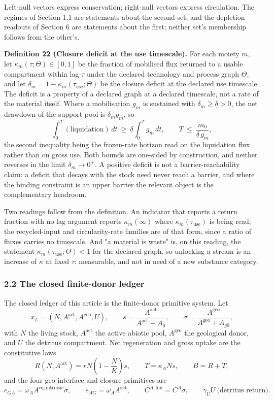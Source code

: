 \documentclass[11pt]{article}
\begin{document}
Left-null vectors express conservation; right-null vectors express circulation. The regimes of
Section 1.1 are statements about the second set, and the depletion readouts of Section 6 are
statements about the first; neither set's membership follows from the other's.

\textbf{Definition 22 (Closure deficit at the use timescale).} For each moiety \(m\), let
\(\kappa_m(\tau;\Theta)\in[0,1]\) be the fraction of mobilised flux returned to a usable compartment
within lag \(\tau\) under the declared technology and process graph \(\Theta\), and let
\(\delta_m=1-\kappa_m(\tau_{\mathrm{use}};\Theta)\) be the closure deficit at the declared use
timescale. The deficit is a property of a declared graph at a declared timescale, not a rate of the
material itself. Where a mobilisation \(g_m\) is sustained with \(\delta_m\ge\underline\delta>0\),
the net drawdown of the support pool is \(\delta_mg_m\), so
\[ \int_0^T(\text{liquidation})\,dt\ \ge\ \underline\delta\int_0^Tg_m\,dt, \qquad T\ \le\ \frac{m_0}{\underline\delta\,g_m}, \]
the second inequality being the frozen-rate horizon read on the liquidation flux rather than on gross
use. Both bounds are one-sided by construction, and neither reverses in the limit
\(\delta_m\to0^+\). A positive deficit is not a barrier-reachability claim: a deficit that decays
with the stock need never reach a barrier, and where the binding constraint is an upper barrier the
relevant object is the complementary headroom.

Two readings follow from the definition. An indicator that reports a return fraction with no lag
argument reports \(\kappa_m(\infty)\) where \(\kappa_m(\tau_{\mathrm{use}})\) is being read; the
recycled-input and circularity-rate families are of that form, since a ratio of fluxes carries no
timescale. And "a material is waste" is, on this reading, the statement
\(\kappa_m(\tau_{\mathrm{use}};\Theta)<1\) for the declared graph, so unlocking a stream is an
increase of \(\kappa\) at fixed \(\tau\): measurable, and not in need of a new substance category.


\subsubsection{2.2 The closed finite-donor
ledger}\label{the-closed-finite-donor-ledger}

The closed ledger of this article is the finite-donor primitive system.
Let
\[x_L = (N, A^{\mathrm{act}}, A^{\mathrm{geo}}, U), \qquad s = \frac{A^{\mathrm{act}}}{A^{\mathrm{act}} + A_0}, \qquad \sigma = \frac{A^{\mathrm{geo}}}{A^{\mathrm{geo}} + A_{g0}},\]
with \(N\) the living stock, \(A^{\mathrm{act}}\) the active abiotic
pool, \(A^{\mathrm{geo}}\) the geological donor, and \(U\) the detritus
compartment. Net regeneration and gross uptake are the constitutive laws
\[R(N, A^{\mathrm{act}}) = rN\left(1 - \frac{N}{K}\right)s, \qquad T = \kappa_A N s, \qquad B = R + T,\]
and the four geo-interface and closure primitives are
\[e_{GA} = \omega_A A^{\mathrm{eq,intrinsic}} \sigma, \qquad e_{AG} = \omega_A A^{\mathrm{act}}, \qquad C^{A,\mathrm{lim}} = C^A \sigma, \qquad \gamma_U U \ \text{(detritus return)}.\]
\end{document}
